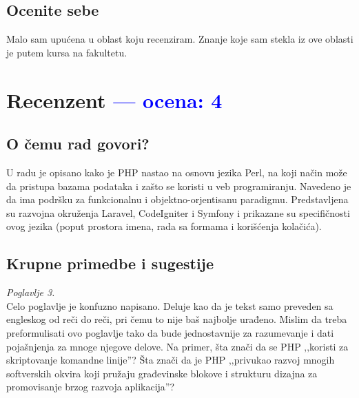 \documentclass[a4paper]{report}
\newcommand{\odgovor}[1]{\textcolor{blue}{#1}}
\begin{document}
\section{Ocenite sebe}
Malo sam upućena u oblast koju recenziram. Znanje koje sam stekla iz ove oblasti je putem kursa na fakultetu.

\chapter{Recenzent \odgovor{--- ocena: 4} }


\section{O čemu rad govori?}
U radu je opisano kako je PHP nastao na osnovu jezika Perl, na koji način može da pristupa bazama podataka i zašto se koristi u veb programiranju. Navedeno je da ima podršku za funkcionalnu i objektno-orjentisanu paradigmu. Predstavljena su razvojna okruženja Laravel, CodeIgniter i Symfony i prikazane su specifičnosti ovog jezika (poput prostora imena, rada sa formama i korišćenja kolačića).

\section{Krupne primedbe i sugestije}

\textit{Poglavlje 3.}\\

Celo poglavlje je konfuzno napisano. Deluje kao da je tekst samo preveden sa engleskog od reči do reči, pri čemu to nije baš najbolje urađeno. Mislim da treba preformulisati ovo poglavlje tako da bude jednostavnije za razumevanje i dati pojašnjenja za mnoge njegove delove. Na primer, šta znači da se PHP ‚‚koristi za skriptovanje komandne linije''? Šta znači da je PHP ‚‚privukao razvoj mnogih softverskih okvira koji pružaju građevinske blokove i strukturu dizajna za promovisanje brzog razvoja aplikacija''?
\end{document}
